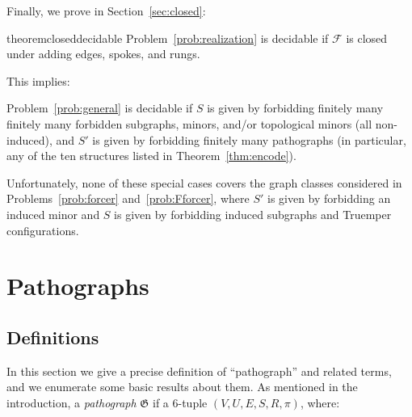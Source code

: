\documentclass{article}
\newcommand{\Fc}{\mathcal{F}}
\newcommand{\Gf}{\mathfrak{G}}
\begin{document}
Finally, we prove in Section~\ref{sec:closed}:

\begin{restatable}{theorem}{closeddecidable}\label{thm:closeddecidable}
Problem~\ref{prob:realization} is decidable if $\Fc$ is closed under adding edges, spokes, and rungs.
\end{restatable}

This implies:

\begin{corollary}
Problem~\ref{prob:general} is decidable if $S$ is given by forbidding finitely many finitely many forbidden subgraphs, minors, and/or topological minors (all non-induced), and $S'$ is given by forbidding finitely many pathographs (in particular, any of the ten structures listed in Theorem~\ref{thm:encode}).
\end{corollary}

Unfortunately, none of these special cases covers the graph classes considered in Problems~\ref{prob:forcer} and~\ref{prob:Fforcer}, where $S'$ is given by forbidding an induced minor and $S$ is given by forbidding induced subgraphs and Truemper configurations.

\section{Pathographs}
\label{sec:pathograph}

\subsection{Definitions}

In this section we give a precise definition of ``pathograph'' and related terms, and we enumerate some basic results about them.
As mentioned in the introduction, a \textit{pathograph} $\Gf$ if a 6-tuple $(V, U, E, S, R, \pi)$, where:
\end{document}

